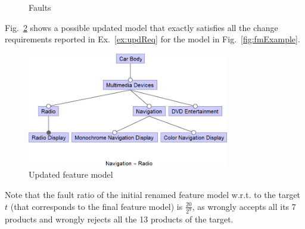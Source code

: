 \begin{tikzborder}{\cite{Gargantini16:validation}}
\begin{tikzborder}{\cite{gargantini_combinatorial_2017}}
\begin{tikzborder}{\cite{gargantini_combinatorial_2017}}
\begin{tikzborder}{\cite{garn2019}}
\begin{tikzborder}{\cite{arcaini2019achieving}}
	\begin{figure}[h]
		\def\languageAll{(-1.2,-1.2) rectangle (2.2cm,1.2cm)}
		\def\firstcircle{(0,0) circle (1cm)}
		\def\circleS{(0:1cm) circle (1cm)}
		\centering
		\caption{Faults}
		\label{fig:faults}
	\end{figure}
	
	\begin{exmp}
		\bb Fig.~\ref{fig:exampleUpdatedFM} shows a possible updated model that exactly satisfies all the change requirements reported in Ex.~\ref{ex:updReq} for the model in Fig.~\ref{fig:fmExample}.\be 
		\begin{figure}[htb!]
			\centering
			\includegraphics[height=5cm]{car2011_4paper}
			\caption{Updated feature model}
			\label{fig:exampleUpdatedFM}
		\end{figure}
		\bb Note that the fault ratio of the initial renamed feature model \initFm w.r.t. to the target $t$ (that corresponds to the final feature model) is $\frac{20}{2^9}$, as \initFm wrongly accepts all its 7 products and wrongly rejects all the 13 products of the target.\be
	\end{exmp}
	

\end{tikzborder}
\end{tikzborder}
\end{tikzborder}
\end{tikzborder}
\end{tikzborder}
